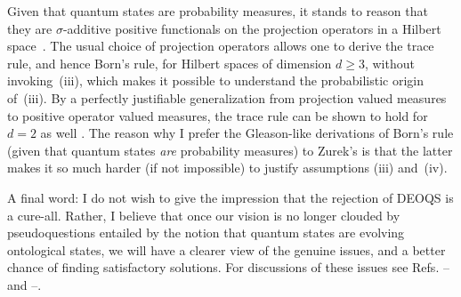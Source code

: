 \documentclass[12pt]{article}
\begin{document}
Given that quantum states are probability measures, it stands to reason that they 
are $\sigma$-additive positive functionals on the projection operators in a Hilbert 
space~\cite{Jauch}. The usual choice of projection operators allows one to 
derive the trace rule,\cite{Gleason} and hence Born's rule, for Hilbert spaces of 
dimension $d\geq3$, without invoking~(iii), which makes it possible to 
understand the probabilistic origin of~(iii). By a perfectly justifiable 
generalization from projection valued measures to positive operator valued 
measures, the trace rule can be shown to hold for $d=2$ as well 
\cite{Fuchs,Busch,Cavesetal}. The reason why I prefer the Gleason-like 
derivations of Born's rule (given that quantum states {\it are\/} probability 
measures) to Zurek's is that the latter makes it so much harder (if not 
impossible) to justify assumptions (iii) and~(iv).

A final word: I do not wish to give the impression that the rejection of DEOQS is a 
cure-all. Rather, I believe that once our vision is no longer clouded by 
pseudoquestions entailed by the notion that quantum states are evolving 
ontological states, we will have a clearer view of the genuine issues, and a better 
chance of finding satisfactory solutions. For discussions of these issues see Refs. 
\cite{Pseudo}--\cite{IUCAA} and \cite{DQSE}--\cite{elusive}.
\end{document}
